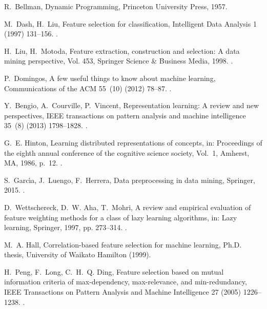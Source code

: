 \documentclass[preprint,5p,compress]{elsarticle}
\begin{document}
\begin{thebibliography}{100}
R.~Bellman, {Dynamic Programming}, Princeton University Press, 1957.

M.~Dash, H.~Liu, Feature selection for classification, Intelligent Data
  Analysis 1 (1997) 131--156.
\newblock \href {http://dx.doi.org/10.3233/IDA-1997-1302}
  {}.

H.~Liu, H.~Motoda, Feature extraction, construction and selection: A data
  mining perspective, Vol. 453, Springer Science \& Business Media, 1998.
\newblock \href {http://dx.doi.org/10.1007/978-1-4615-5725-8}
  {}.

P.~Domingos, A few useful things to know about machine learning, Communications
  of the ACM 55~(10) (2012) 78--87.
\newblock \href {http://dx.doi.org/10.1145/2347736.2347755}
  {}.

Y.~Bengio, A.~Courville, P.~Vincent, Representation learning: A review and new
  perspectives, {IEEE} transactions on pattern analysis and machine
  intelligence 35~(8) (2013) 1798--1828.
\newblock \href {http://dx.doi.org/10.1109/TPAMI.2013.50}
  {}.

G.~E. Hinton, Learning distributed representations of concepts, in: Proceedings
  of the eighth annual conference of the cognitive science society, Vol.~1,
  Amherst, MA, 1986, p.~12.
\newblock \href {http://dx.doi.org/10.1109/69.917563}
  {}.

S.~Garc{\'\i}a, J.~Luengo, F.~Herrera, Data preprocessing in data mining,
  Springer, 2015.
\newblock \href {http://dx.doi.org/10.1007/978-3-319-10247-4}
  {}.

D.~Wettschereck, D.~W. Aha, T.~Mohri, A review and empirical evaluation of
  feature weighting methods for a class of lazy learning algorithms, in: Lazy
  learning, Springer, 1997, pp. 273--314.
\newblock \href {http://dx.doi.org/10.1023/A:1006593614256}
  {}.

M.~A. Hall, Correlation-based feature selection for machine learning, Ph.D.
  thesis, University of Waikato Hamilton (1999).

H.~Peng, F.~Long, C.~H.~Q. Ding, Feature selection based on mutual information
  criteria of max-dependency, max-relevance, and min-redundancy, IEEE
  Transactions on Pattern Analysis and Machine Intelligence 27 (2005)
  1226--1238.
\newblock \href {http://dx.doi.org/10.1109/TPAMI.2005.159}
  {}.


\end{thebibliography}
\end{document}
